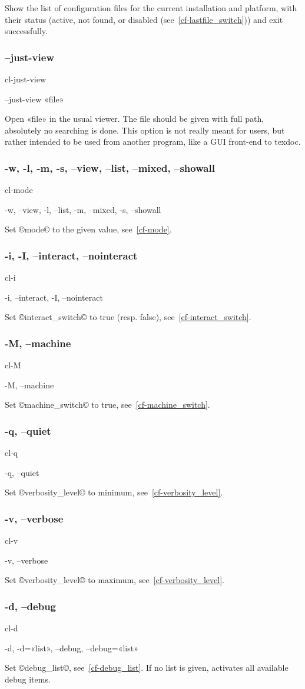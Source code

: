 \documentclass[a4paper, oneside]{scrartcl}
\newif\ifframed
\newenvironment{cmdsubsub}[2]{%
  \framedfalse \commandes\subsubsection{#1}{#2}%
  }{%
  \endcommandes}
\begin{document}
Show the list of configuration files for the current installation and
platform, with their status (active, not found, or disabled
(see~\ref{cf-lastfile_switch})) and exit successfully.

\begin{cmdsubsub}{--just-view}{cl-just-view}
  --just-view «file»
\end{cmdsubsub}

Open «file» in the usual viewer. The file should be given with full path,
absolutely no searching is done. This option is not really meant for users,
but rather intended to be used from another program, like a GUI front-end to
texdoc.

\begin{cmdsubsub}{-w, -l, -m, -s, --view, --list, --mixed, --showall}{cl-mode}
  -w, --view, -l, --list, -m, --mixed, -s, --showall
\end{cmdsubsub}

Set ©mode© to the given value, see~\ref{cf-mode}.

\begin{cmdsubsub}{-i, -I, --interact, --nointeract}{cl-i}
  -i, --interact, -I, --nointeract
\end{cmdsubsub}

Set ©interact_switch© to true (resp. false), see~\ref{cf-interact_switch}.

\begin{cmdsubsub}{-M, --machine}{cl-M}
  -M, --machine
\end{cmdsubsub}

Set ©machine_switch© to true, see~\ref{cf-machine_switch}.

\begin{cmdsubsub}{-q, --quiet}{cl-q}
  -q, --quiet
\end{cmdsubsub}

Set ©verbosity_level© to minimum, see~\ref{cf-verbosity_level}.

\begin{cmdsubsub}{-v, --verbose}{cl-v}
  -v, --verbose
\end{cmdsubsub}

Set ©verbosity_level© to maximum, see~\ref{cf-verbosity_level}.

\begin{cmdsubsub}{-d, --debug}{cl-d}
  -d, -d=«list», --debug, --debug=«list»
\end{cmdsubsub}

Set ©debug_list©, see~\ref{cf-debug_list}. If no list is given, activates all
available debug items.
\end{document}
